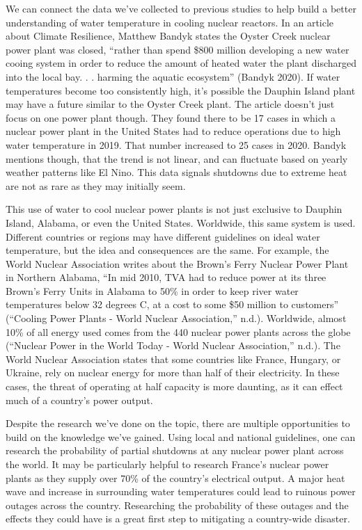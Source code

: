 \documentclass[
  letterpaper,
  DIV=11,
  numbers=noendperiod]{scrreprt}
\begin{document}
We can connect the data we've collected to previous studies to help
build a better understanding of water temperature in cooling nuclear
reactors. In an article about Climate Resilience, Matthew Bandyk states
the Oyster Creek nuclear power plant was closed, ``rather than spend
\$800 million developing a new water cooing system in order to reduce
the amount of heated water the plant discharged into the local bay. . .
harming the aquatic ecosystem'' (Bandyk 2020). If water temperatures
become too consistently high, it's possible the Dauphin Island plant may
have a future similar to the Oyster Creek plant. The article doesn't
just focus on one power plant though. They found there to be 17 cases in
which a nuclear power plant in the United States had to reduce
operations due to high water temperature in 2019. That number increased
to 25 cases in 2020. Bandyk mentions though, that the trend is not
linear, and can fluctuate based on yearly weather patterns like El Nino.
This data signals shutdowns due to extreme heat are not as rare as they
may initially seem.

This use of water to cool nuclear power plants is not just exclusive to
Dauphin Island, Alabama, or even the United States. Worldwide, this same
system is used. Different countries or regions may have different
guidelines on ideal water temperature, but the idea and consequences are
the same. For example, the World Nuclear Association writes about the
Brown's Ferry Nuclear Power Plant in Northern Alabama, ``In mid 2010,
TVA had to reduce power at its three Brown's Ferry Units in Alabama to
50\% in order to keep river water temperatures below 32 degrees C, at a
cost to some \$50 million to customers'' ({``Cooling Power Plants -
World Nuclear Association,''} n.d.). Worldwide, almost 10\% of all
energy used comes from the 440 nuclear power plants across the globe
({``Nuclear Power in the World Today - World Nuclear Association,''}
n.d.). The World Nuclear Association states that some countries like
France, Hungary, or Ukraine, rely on nuclear energy for more than half
of their electricity. In these cases, the threat of operating at half
capacity is more daunting, as it can effect much of a country's power
output.

Despite the research we've done on the topic, there are multiple
opportunities to build on the knowledge we've gained. Using local and
national guidelines, one can research the probability of partial
shutdowns at any nuclear power plant across the world. It may be
particularly helpful to research France's nuclear power plants as they
supply over 70\% of the country's electrical output. A major heat wave
and increase in surrounding water temperatures could lead to ruinous
power outages across the country. Researching the probability of these
outages and the effects they could have is a great first step to
mitigating a country-wide disaster.
\end{document}
